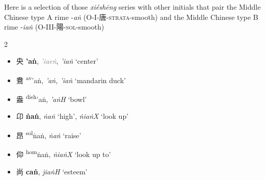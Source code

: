 

Here is a selection of those \textit{xiéshēng} series with other initials that pair the Middle Chinese type A rime -\textit{aṅ} (O-I-唐-\textsc{strata}-smooth) and the Middle Chinese type B rime -\textit{iaṅ} (O-III-陽-\textsc{sol}-smooth)

\begin{multicols}{2}
\raggedcolumns
\begin{itemize}
    \item {\Large{央}} %
    {\large{\textbf{'aṅ}}},
    \textcolor{gray}{\textit{'iaeṅ}}, \textit{'iaṅ} `center'  %

    \item {\Large{鴦}} %
    {\large{{\textsuperscript{av}}'aṅ}},
    \textit{'aṅ, 'iaṅ} `mandarin duck' %

    \item {\Large{盎}} %
    {\large{{\textsuperscript{dish}}'aṅ}},
    \textit{'aṅH} `bowl' %
\end{itemize}

\vspace{2mm}

\begin{itemize}
    \item {\Large{卬}} %
    {\large{\textbf{ṅaṅ}}},
    \textit{ṅaṅ} `high', \textit{ṅiaṅX} `look up'  %

    \item {\Large{昂}} %
    {\large{{\textsuperscript{sol}}ṅaṅ}},
    \textit{ṅaṅ} `raise' %

    \item {\Large{仰}} %
    {\large{{\textsuperscript{hom}}ṅaṅ}},
    \textit{ṅiaṅX} `look up to' %
\end{itemize}

\vspace{2mm}


\begin{itemize}
    \item {\Large{尚}} %
    {\large{\textbf{caṅ}}},
    \textit{jiaṅH} `esteem' %


\end{itemize}
\end{multicols}
